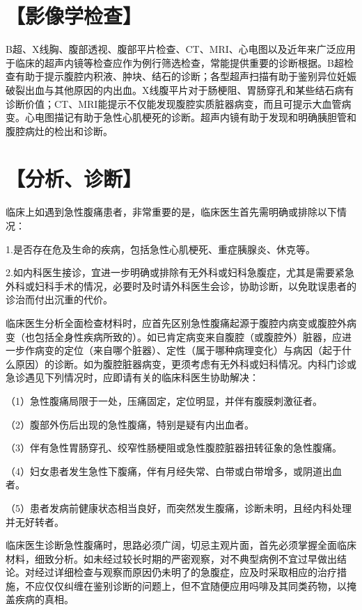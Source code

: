 \section{【影像学检查】}

B超、X线胸、腹部透视、腹部平片检查、CT、MRI、心电图以及近年来广泛应用于临床的超声内镜等检查应作为例行筛选检查，常能提供重要的诊断根据。B超检查有助于提示腹腔内积液、肿块、结石的诊断；各型超声扫描有助于鉴别异位妊娠破裂出血与其他原因的内出血。X线腹平片对于肠梗阻、胃肠穿孔和某些结石病有诊断价值；CT、MRI能提示不仅能发现腹腔实质脏器病变，而且可提示大血管病变。心电图描记有助于急性心肌梗死的诊断。超声内镜有助于发现和明确胰胆管和腹腔病灶的检出和诊断。

\section{【分析、诊断】}

临床上如遇到急性腹痛患者，非常重要的是，临床医生首先需明确或排除以下情况：

1.是否存在危及生命的疾病，包括急性心肌梗死、重症胰腺炎、休克等。

2.如内科医生接诊，宜进一步明确或排除有无外科或妇科急腹症，尤其是需要紧急外科或妇科手术的情况，必要时及时请外科医生会诊，协助诊断，以免耽误患者的诊治而付出沉重的代价。

临床医生分析全面检查材料时，应首先区别急性腹痛起源于腹腔内病变或腹腔外病变（也包括全身性疾病所致的）。如已肯定病变来自腹腔（或腹腔外）脏器，应进一步作病变的定位（来自哪个脏器）、定性（属于哪种病理变化）与病因（起于什么原因）的诊断。如为腹腔脏器病变，更须考虑有无外科或妇科情况。内科门诊或急诊遇见下列情况时，应即请有关的临床科医生协助解决：

（1）急性腹痛局限于一处，压痛固定，定位明显，并伴有腹膜刺激征者。

（2）腹部外伤后出现的急性腹痛，特别是疑有内出血者。

（3）伴有急性胃肠穿孔、绞窄性肠梗阻或急性腹腔脏器扭转征象的急性腹痛。

（4）妇女患者发生急性下腹痛，伴有月经失常、白带或白带增多，或阴道出血者。

（5）患者发病前健康状态相当良好，而突然发生腹痛，诊断未明，且经内科处理并无好转者。

临床医生诊断急性腹痛时，思路必须广阔，切忌主观片面，首先必须掌握全面临床材料，细致分析。如未经过较长时期的严密观察，对不典型病例不宜过早做出结论。对经过详细检查与观察而原因仍未明了的急腹症，应及时采取相应的治疗措施，不应仅仅纠缠在鉴别诊断的问题上，但不宜随便应用吗啡及其同类药物，以掩盖疾病的真相。

